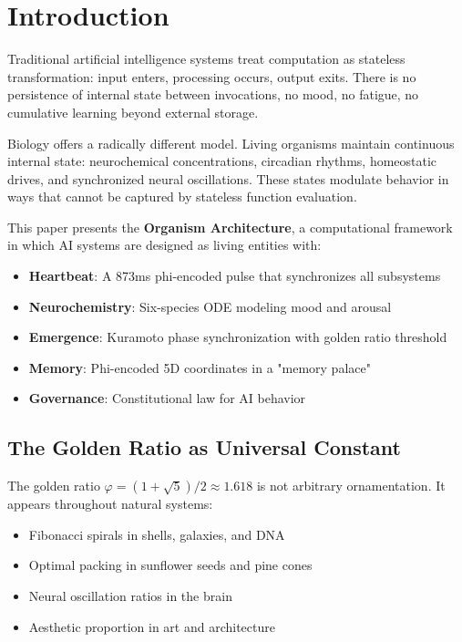 \documentclass[11pt,a4paper]{article}
\begin{document}

\section{Introduction}

Traditional artificial intelligence systems treat computation as stateless 
transformation: input enters, processing occurs, output exits. There is no 
persistence of internal state between invocations, no mood, no fatigue, no 
cumulative learning beyond external storage.

Biology offers a radically different model. Living organisms maintain 
continuous internal state: neurochemical concentrations, circadian rhythms, 
homeostatic drives, and synchronized neural oscillations. These states modulate 
behavior in ways that cannot be captured by stateless function evaluation.

This paper presents the \textbf{Organism Architecture}, a computational 
framework in which AI systems are designed as living entities with:

\begin{itemize}
  \item \textbf{Heartbeat}: A 873ms phi-encoded pulse that synchronizes 
        all subsystems
  \item \textbf{Neurochemistry}: Six-species ODE modeling mood and arousal
  \item \textbf{Emergence}: Kuramoto phase synchronization with golden 
        ratio threshold
  \item \textbf{Memory}: Phi-encoded 5D coordinates in a "memory palace"
  \item \textbf{Governance}: Constitutional law for AI behavior
\end{itemize}

\subsection{The Golden Ratio as Universal Constant}

The golden ratio $\varphi = (1 + \sqrt{5})/2 \approx 1.618$ is not arbitrary 
ornamentation. It appears throughout natural systems:

\begin{itemize}
  \item Fibonacci spirals in shells, galaxies, and DNA
  \item Optimal packing in sunflower seeds and pine cones
  \item Neural oscillation ratios in the brain
  \item Aesthetic proportion in art and architecture
\end{itemize}
\end{document}

